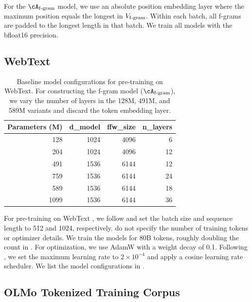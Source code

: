 For the $\Afgram$ model, we use an absolute position embedding layer where the maximum position equals the longest  in $V_{\mathrm{f\text{-}gram}}$. Within each batch, all f-grams are padded to the longest  length in that batch. We train all models with the bfloat16 precision.


\subsection{WebText}
\label{subsec:webtext_details}

\begin{table}[h]
    \centering
    \begin{tabular}{r|r r r}
        \toprule
        \textbf{Parameters (M)} & \textbf{d\_model} & \textbf{ffw\_size} & \textbf{n\_layers} \\
        \midrule
        128  & 1024  & 4096  & 6   \\
        204  & 1024  & 4096  & 12     \\
        491  & 1536  & 6144  & 12     \\
        759  & 1536  & 6144  & 24     \\
        589  & 1536  & 6144  & 18     \\
        1099  & 1536  & 6144  & 36    \\
        \bottomrule
    \end{tabular}
    \caption{Baseline model configurations for pre-training on WebText. For constructing the f-gram model ($\Afgram$), we vary the number of layers in the 128M, 491M, and 589M variants and discard the token embedding layer.}
    \label{tab:webtext_model_configs}
\end{table}


For pre-training on WebText \citep{openwebtext}, we follow \citet{radford2019language} and set the batch size and sequence length to 512 and 1024, respectively. \citet{radford2019language} do not specify the number of training tokens or optimizer details. We train the models for 80B tokens, roughly doubling the count in \citet{radford2018improving}. For optimization, we use AdamW \citep{loshchilov2017decoupled} with a weight decay of 0.1. Following \citet{hoffmann2022training}, we set the maximum learning rate to $2\times 10^{-4}$ and apply a cosine learning rate scheduler. We list the model configurations in .



\subsection{OLMo Tokenized Training Corpus}
\label{subsec:dolma_details}

